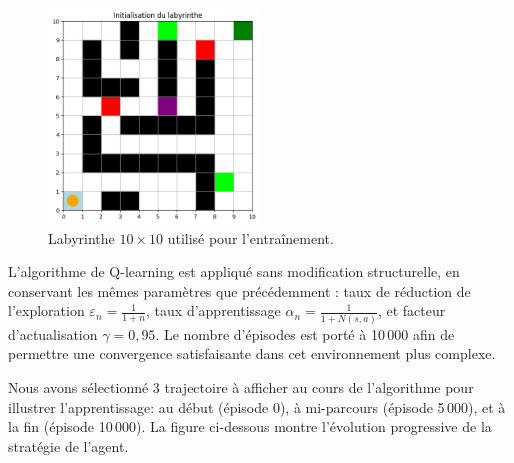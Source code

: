 \documentclass[12pt]{article}
\begin{document}
\begin{figure}[H]
    \centering
    \includegraphics[width=0.5\textwidth]{INI.png}
    \caption{Labyrinthe \(10 \times 10\) utilisé pour l'entraînement.}
\end{figure}

L'algorithme de Q-learning est appliqué sans modification structurelle, en conservant les mêmes paramètres que précédemment : taux de réduction de l'exploration \(\varepsilon_n = \frac{1}{1+n}\), taux d’apprentissage \(\alpha_n = \frac{1}{1 + N(s,a)}\), et facteur d’actualisation \(\gamma = 0{,}95\). Le nombre d’épisodes est porté à 10\,000 afin de permettre une convergence satisfaisante dans cet environnement plus complexe.

Nous avons sélectionné 3 trajectoire à afficher au cours de l’algorithme pour illustrer l'apprentissage: au début (épisode 0), à mi-parcours (épisode 5\,000), et à la fin (épisode 10\,000). La figure ci-dessous montre l’évolution progressive de la stratégie de l’agent.
\end{document}
